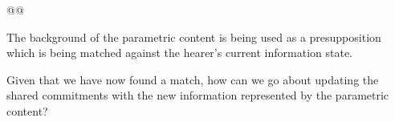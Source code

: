 @@

The background of the parametric content is
being used as a presupposition which is being matched against the
hearer's current information state.

Given that we have now found a match, how can we go about updating the
shared commitments with the new information represented by the
parametric content?  %
 
 
 

